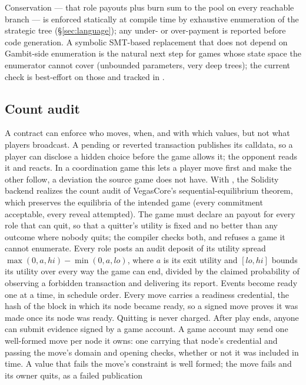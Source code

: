 Conservation --- that role payouts plus burn sum to the pool on
every reachable branch --- is enforced statically at compile
time by exhaustive enumeration of the strategic tree
(\S\ref{sec:language}); any under- or over-payment is reported
before code generation.  A symbolic SMT-based replacement that
does not depend on Gambit-side enumeration is the natural next
step for games whose state space the enumerator cannot cover
(unbounded  parameters, very deep trees); the current
check is best-effort on those and tracked in .

\subsection{Count audit}
\label{sec:solidity:audit}

A contract can enforce who moves, when, and with which values, but not
what players broadcast.  A pending or reverted transaction publishes
its calldata, so a player can disclose a hidden choice before the game
allows it; the opponent reads it and reacts.  In a coordination game
this lets a player move first and make the other follow, a deviation
the source game does not have.  With , the Solidity
backend realizes the count audit of VegasCore's sequential-equilibrium
theorem, which preserves the equilibria of the intended game (every
commitment acceptable, every reveal attempted).  The game must declare
an  payout for every role that can quit, so that a quitter's
utility is fixed and no better than any outcome where nobody quits;
the compiler checks both, and refuses a game it cannot enumerate.
Every role posts an audit deposit of its utility spread
$\max(0,a,\mathit{hi})-\min(0,a,\mathit{lo})$, where $a$ is its exit
utility and $[\mathit{lo},\mathit{hi}]$ bounds its utility over every
way the game can end, divided by the claimed probability of observing
a forbidden transaction and delivering its report.  Events become
ready one at a time, in schedule order.  Every move carries a
readiness credential, the hash of the block in which its node became
ready, so a signed move proves it was made once its node was ready.
Quitting is never charged.  After play ends, anyone can submit evidence
signed by a game account.  A game account may send one well-formed
move per node it owns: one carrying that node's credential and passing
the move's domain and opening checks, whether or not it was included
in time.  A value that fails the move's  constraint is well
formed; the move fails and its owner quits, as a failed publication
